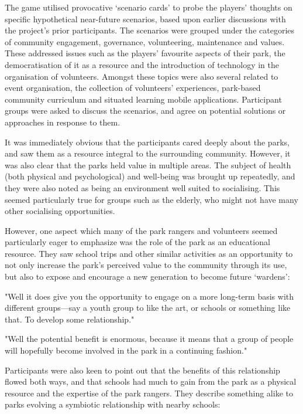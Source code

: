 The game utilised provocative `scenario cards' to probe the players’ thoughts on specific hypothetical near-future scenarios, based upon earlier discussions with the project's prior participants. The scenarios were grouped under the categories of community engagement, governance, volunteering, maintenance and values. These addressed issues such as the players’ favourite aspects of their park, the democratisation of it as a resource and the introduction of technology in the organisation of volunteers. Amongst these topics were also several related to event organisation, the collection of volunteers’ experiences, park-based community curriculum and situated learning mobile applications. Participant groups were asked to discuss the scenarios, and agree on potential solutions or approaches in response to them.

It was immediately obvious that the participants cared deeply about the parks, and saw them as a resource integral to the surrounding community. However, it was also clear that the parks held value in multiple areas. The subject of health (both physical and psychological) and well-being was brought up repeatedly, and they were also noted as being an environment well suited to socialising. This seemed particularly true for groups such as the elderly, who might not have many other socialising opportunities.

However, one aspect which many of the park rangers and volunteers seemed particularly eager to emphasize was the role of the park as an educational resource. They saw school trips and other similar activities as an opportunity to not only increase the park’s perceived value to the community through its use, but also to expose and encourage a new generation to become future ‘wardens’:

\begin{displayquote}
"Well it does give you the opportunity to engage on a more long-term basis with different groups---say a youth group to like the art, or schools or something like that. To develop some relationship."
\end{displayquote}

\begin{displayquote}
"Well the potential benefit is enormous, because it means that a group of people will hopefully become involved in the park in a continuing fashion."
\end{displayquote}

Participants were also keen to point out that the benefits of this relationship flowed both ways, and that schools had much to gain from the park as a physical resource and the expertise of the park rangers. They describe something alike to parks evolving a symbiotic relationship with nearby schools:

